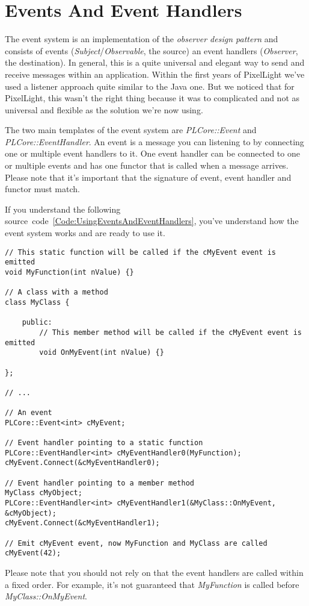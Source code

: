 \section{Events And Event Handlers}
\label{Chapter:EventsAndEventHandlers}
The event system is an implementation of the \emph{observer design pattern} and consists of events (\emph{Subject}/\emph{Observable}, the source) an event handlers (\emph{Observer}, the destination). In general, this is a quite universal and elegant way to send and receive messages within an application. Within the first years of PixelLight we've used a listener approach quite similar to the Java one. But we noticed that for PixelLight, this wasn't the right thing because it was to complicated and not as universal and flexible as the solution we're now using.

The two main templates of the event system are \emph{PLCore::Event} and \emph{PLCore::EventHandler}. An event is a message you can listening to by connecting one or multiple event handlers to it. One event handler can be connected to one or multiple events and has one functor that is called when a message arrives. Please note that it's important that the signature of event, event handler and functor must match.

If you understand the following source~code~\ref{Code:UsingEventsAndEventHandlers}, you've understand how the event system works and are ready to use it.
\begin{lstlisting}[label=Code:UsingEventsAndEventHandlers,caption={Using events and event handlers}]
// This static function will be called if the cMyEvent event is emitted
void MyFunction(int nValue) {}

// A class with a method
class MyClass {

	public:
		// This member method will be called if the cMyEvent event is emitted
		void OnMyEvent(int nValue) {}

};

// ...

// An event
PLCore::Event<int> cMyEvent;

// Event handler pointing to a static function
PLCore::EventHandler<int> cMyEventHandler0(MyFunction);
cMyEvent.Connect(&cMyEventHandler0);

// Event handler pointing to a member method
MyClass cMyObject;
PLCore::EventHandler<int> cMyEventHandler1(&MyClass::OnMyEvent, &cMyObject);
cMyEvent.Connect(&cMyEventHandler1);

// Emit cMyEvent event, now MyFunction and MyClass are called
cMyEvent(42);
\end{lstlisting}
Please note that you should not rely on that the event handlers are called within a fixed order. For example, it's not guaranteed that \emph{MyFunction} is called before \emph{MyClass::OnMyEvent}.
